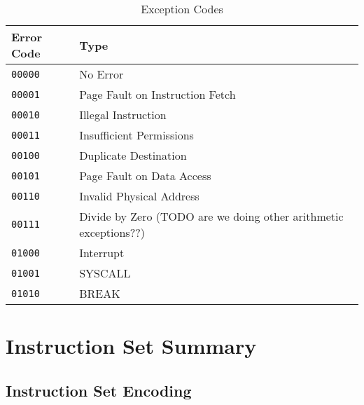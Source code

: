 \documentclass[11pt,openany]{report}
\begin{document}
\begin{table}[!h]
\begin{tabular}{l|l}
Error Code & Type\\
\hline
\texttt{00000} & No Error\\
\texttt{00001} & Page Fault on Instruction Fetch\\
\texttt{00010} & Illegal Instruction\\
\texttt{00011} & Insufficient Permissions\\
\texttt{00100} & Duplicate Destination\\
\texttt{00101} & Page Fault on Data Access\\
\texttt{00110} & Invalid Physical Address\\
\texttt{00111} & Divide by Zero (TODO are we doing other arithmetic exceptions??)\\
\texttt{01000} & Interrupt\\
\texttt{01001} & SYSCALL\\
\texttt{01010} & BREAK
\end{tabular}
\caption{Exception Codes}
\label{tab:exncodes}
\end{table}


\chapter{Instruction Set Summary}

\section{Instruction Set Encoding}
\end{document}
